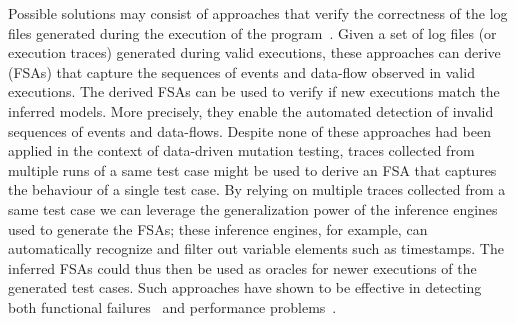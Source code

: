 Possible solutions may consist of approaches that verify the correctness of the log files generated during the execution of the program~\cite{Pastore:ISSRE:08,Pastore:TKT:17}.
Given a set of log files (or execution traces) generated during valid executions, these approaches can derive  (FSAs) that capture the sequences of events and data-flow observed in valid executions. The derived FSAs can be used to verify if new executions match the inferred models. More precisely, they enable the automated detection of invalid sequences of events and data-flows. Despite none of these approaches had been applied in the context of data-driven mutation testing, traces collected from multiple runs of a same test case might be used to derive an FSA that captures the behaviour of a single test case. By relying on multiple traces collected from a same test case we can leverage the generalization power of the inference engines used to generate the FSAs; these inference engines, for example, can automatically recognize and filter out variable elements such as timestamps. The inferred FSAs could thus then be used as oracles for newer executions of the generated test cases. Such approaches have shown to be effective in detecting both functional failures~\cite{Pastore:ISSRE:08} and performance problems~\cite{Pastore:TKT:17}.



